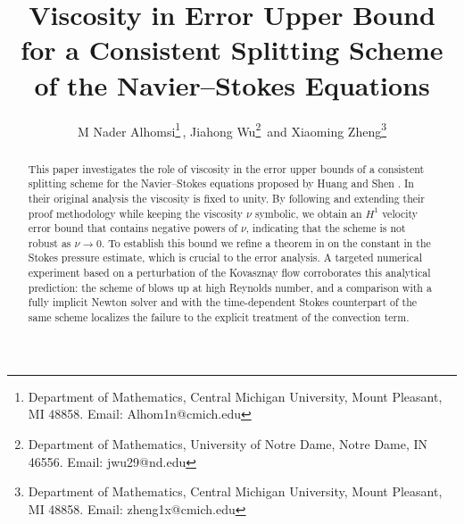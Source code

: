 \documentclass{article}
\theoremstyle{definition}                   %
\begin{document}
\title{Viscosity in  Error Upper Bound for a Consistent Splitting Scheme of the Navier–Stokes Equations}
\author{M Nader Alhomsi\footnote{Department of Mathematics,  Central Michigan University, 
Mount Pleasant, MI 48858. Email: Alhom1n@cmich.edu}\,, Jiahong Wu\footnote{Department of Mathematics,  University of Notre Dame, 
Notre Dame, IN 46556. Email: jwu29@nd.edu}\,
and Xiaoming Zheng\footnote{Department of Mathematics, Central Michigan University, Mount Pleasant, MI 48858. Email: zheng1x@cmich.edu}
}
\date{}
\maketitle

\begin{abstract}
This paper investigates the role of viscosity in the error upper bounds of a consistent splitting scheme for the Navier--Stokes equations proposed by Huang and Shen \cite{HuangShen2023}. In their original analysis the viscosity is fixed to unity. By following and extending their proof methodology while keeping the viscosity $\nu$ symbolic, we obtain an $H^{1}$ velocity error bound that contains negative powers of $\nu$, indicating that the scheme is not robust as $\nu\to 0$. To establish this bound we refine a theorem in \cite{LiuLiuPego2007} on the constant in the Stokes pressure estimate, which is crucial to the error analysis. A targeted numerical experiment based on a perturbation of the Kovasznay flow corroborates this analytical prediction: the scheme of \cite{HuangShen2023} blows up at high Reynolds number, and a comparison with a fully implicit Newton solver and with the time-dependent Stokes counterpart of the same scheme localizes the failure to the explicit treatment of the convection term.
\end{abstract}
\end{document}
